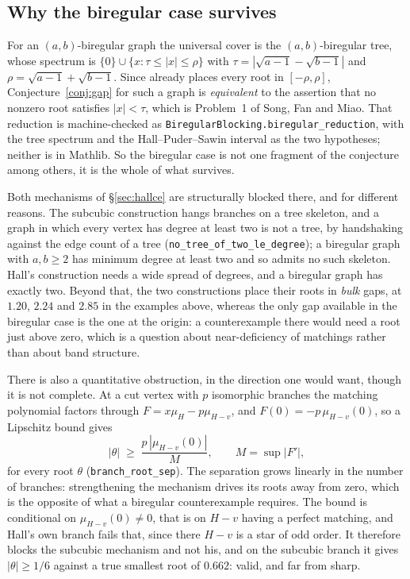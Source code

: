 \documentclass[11pt]{article}
\theoremstyle{remark}
\begin{document}
\subsection{Why the biregular case survives}\label{sec:biregblock}

For an $(a,b)$-biregular graph the universal cover is the $(a,b)$-biregular tree, whose
spectrum is $\{0\}\cup\{x:\tau\le|x|\le\rho\}$ with
$\tau=|\sqrt{a-1}-\sqrt{b-1}|$ and $\rho=\sqrt{a-1}+\sqrt{b-1}$. Since \cite{HPS} already
places every root in $[-\rho,\rho]$, Conjecture~\ref{conj:gap} for such a graph is
\emph{equivalent} to the assertion that no nonzero root satisfies $|x|<\tau$, which is
Problem~1 of Song, Fan and Miao. That reduction is machine-checked as
\texttt{BiregularBlocking.biregular\_reduction}, with the tree spectrum and the
Hall--Puder--Sawin interval as the two hypotheses; neither is in Mathlib. So the biregular
case is not one fragment of the conjecture among others, it is the whole of what survives.

Both mechanisms of \S\ref{sec:hallce} are structurally blocked there, and for different
reasons. The subcubic construction hangs branches on a tree skeleton, and a graph in which
every vertex has degree at least two is not a tree, by handshaking against the edge count of
a tree (\texttt{no\_tree\_of\_two\_le\_degree}); a biregular graph with $a,b\ge2$ has minimum
degree at least two and so admits no such skeleton. Hall's construction needs a wide spread of
degrees, and a biregular graph has exactly two. Beyond that, the two constructions place their
roots in \emph{bulk} gaps, at $1.20$, $2.24$ and $2.85$ in the examples above, whereas the
only gap available in the biregular case is the one at the origin: a counterexample there
would need a root just above zero, which is a question about near-deficiency of matchings
rather than about band structure.

There is also a quantitative obstruction, in the direction one would want, though it is not
complete. At a cut vertex with $p$ isomorphic branches the matching polynomial factors through
$F=x\mu_H-p\mu_{H-v}$, and $F(0)=-p\,\mu_{H-v}(0)$, so a Lipschitz bound gives
\[
   |\theta|\;\ge\;\frac{p\,|\mu_{H-v}(0)|}{M},\qquad M=\sup|F'| ,
\]
for every root $\theta$ (\texttt{branch\_root\_sep}). The separation grows linearly in the
number of branches: strengthening the mechanism drives its roots away from zero, which is the
opposite of what a biregular counterexample requires. The bound is conditional on
$\mu_{H-v}(0)\neq0$, that is on $H-v$ having a perfect matching, and Hall's own branch fails
that, since there $H-v$ is a star of odd order. It therefore blocks the subcubic mechanism and
not his, and on the subcubic branch it gives $|\theta|\ge1/6$ against a true smallest root of
$0.662$: valid, and far from sharp.
\end{document}
